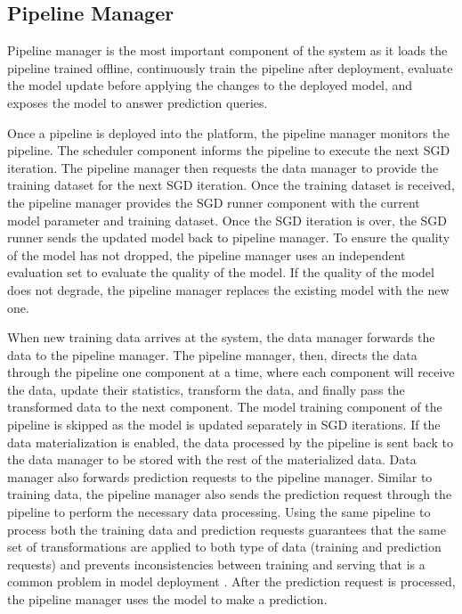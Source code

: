 \subsection{Pipeline Manager} \label{pipeline-manager} 
Pipeline manager is the most important component of the system as it loads the pipeline trained offline, continuously train the pipeline after deployment, evaluate the model update before applying the changes to the deployed model, and exposes the model to answer prediction queries.

Once a pipeline is deployed into the platform, the pipeline manager monitors the pipeline.
The scheduler component informs the pipeline to execute the next SGD iteration.
The pipeline manager then requests the data manager to provide the training dataset for the next SGD iteration.
Once the training dataset is received, the pipeline manager provides the SGD runner component with the current model parameter and training dataset.
Once the SGD iteration is over, the SGD runner sends the updated model back to pipeline manager.
To ensure the quality of the model has not dropped, the pipeline manager uses an independent evaluation set to evaluate the quality of the model.
If the quality of the model does not degrade, the pipeline manager replaces the existing model with the new one.

When new training data arrives at the system, the data manager forwards the data to the pipeline manager. 
The pipeline manager, then, directs the data through the pipeline one component at a time, where each component will receive the data, update their statistics, transform the data, and finally pass the transformed data to the next component.
The model training component of the pipeline is skipped as the model is updated separately in SGD iterations.
If the data materialization is enabled, the data processed by the pipeline is sent back to the data manager to be stored with the rest of the materialized data.
Data manager also forwards prediction requests to the pipeline manager.
Similar to training data, the pipeline manager also sends the prediction request through the pipeline to perform the necessary data processing.
Using the same pipeline to process both the training data and prediction requests guarantees that the same set of transformations are applied to both type of data (training and prediction requests) and prevents inconsistencies between training and serving that is a common problem in model deployment \cite{baylor2017tfx}.
After the prediction request is processed, the pipeline manager uses the model to make a prediction.


